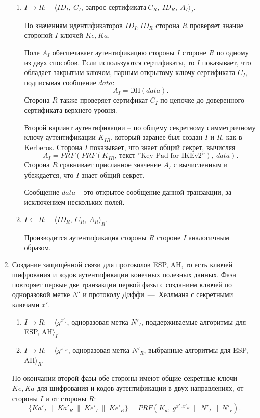 \begin{enumerate}
\begin{enumerate}
            \item $I \rightarrow R$: ~ $\langle ID_I, ~ C_I, ~\text{запрос сертификата}~ C_R, ~ ID_R, ~ A_I \rangle_I$.

                По значениям идентификаторов $ID_I, ID_R$ сторона $R$ проверяет знание стороной $I$ ключей $Ke, Ka$.

                Поле $A_I$ обеспечивает аутентификацию стороны $I$ стороне $R$ по одному из двух способов. Если используются сертификаты, то $I$ показывает, что обладает закрытым ключом, парным открытому ключу сертификата $C_I$, подписывая сообщение $data$:
                    \[ A_I = \textrm{ЭП}(data). \]
                Сторона $R$ также проверяет сертификат $C_I$ по цепочке до доверенного сертификата верхнего уровня.

                Второй вариант аутентификации  -- по общему секретному симметричному ключу аутентификации $K_{IR}$, который заранее был создан $I$ и $R$, как в Kerberos. Сторона $I$ показывает, что знает общий секрет, вычисляя
                    \[ A_I = PRF( PRF(K_{IR}, ~ \text{текст ''Key Pad for IKEv2''}), ~ data). \]
                Сторона $R$ сравнивает присланное значение $A_I$ с вычисленным и убеждается, что $I$ знает общий секрет.

                Сообщение $data$ -- это открытое сообщение данной транзакции, за исключением нескольких полей.

            \item $I \leftarrow R$: ~ $\langle ID_R, ~ C_R, ~ A_R \rangle_R$.

                Производится аутентификация стороны $R$ стороне $I$ аналогичным образом.
        \end{enumerate}

    \item Создание защищённой связи для протоколов ESP, AH, то есть ключей шифрования и кодов аутентификации конечных полезных данных. Фаза повторяет первые две транзакции первой фазы с созданием ключей по одноразовой метке $N'$ и протоколу Диффи~---~Хеллмана с секретными ключами $x'$.
        \begin{enumerate}
            \item $I \rightarrow R$: ~ $\langle g^{x'_I}$, одноразовая метка $N'_I$, поддерживаемые алгоритмы для ESP, AH$\rangle_I$.
            \item $I \rightarrow R$: ~ $\langle g^{x'_R}$, одноразовая метка $N'_R$, выбранные алгоритмы для ESP, AH$\rangle_R$.
        \end{enumerate}
        По окончании второй фазы обе стороны имеют общие секретные ключи $Ke, Ka$ для шифрования и кодов аутентификации в двух направлениях, от стороны $I$ и от стороны $R$:
            \[ \{Ka'_I ~\|~ Ka'_R ~\|~ Ke'_I ~\|~ Ke'_R \} = PRF(K_d, ~ g^{x'_I x'_R} ~\|~ N'_I ~\|~ N'_r). \]
\end{enumerate}

